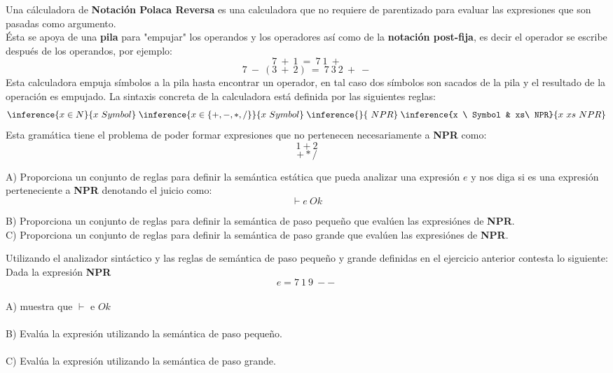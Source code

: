     \begin{exercise}
        Una cálculadora de \textbf{Notación Polaca Reversa} es una calculadora que no requiere de parentizado para evaluar las expresiones que son pasadas como argumento.\\
        Ésta se apoya de una \textbf{pila} para "empujar" los operandos y los operadores así como de la \textbf{notación post-fija}, es decir el operador se escribe después de los operandos, por ejemplo:
        $$7\ +\ 1\ =\ 7\ 1\ + $$ 
        $$7\ -\ (3\ +\ 2)\ =\ 7\ 3\ 2\ +\ -$$
        Esta calculadora empuja símbolos a la pila hasta encontrar un operador, en tal caso dos símbolos son sacados de la pila y el resultado de la operación es empujado.
        La sintaxis concreta de la calculadora está definida por las siguientes reglas: \\
        \[
            \inference{x \in N}{x \ Symbol} \; \inference{x \in \{+,-,*,/ \}}{x \ Symbol} \; \inference{}{\empty \ NPR} \; \inference{x \ Symbol & xs\ NPR}{x \ xs \ NPR}
        \]
        Esta gramática tiene el problema de poder formar expresiones que no pertenecen necesariamente a \textbf{NPR} como:
        $$ 1 + 2$$ 
        $$ + * /$$

        A) Proporciona un conjunto de reglas para definir la semántica estática que pueda analizar una expresión $e$ y nos diga si es una expresión perteneciente a \textbf{NPR} denotando el juicio como:
        $$ \vdash e \ Ok $$

        B) Proporciona un conjunto de reglas para definir la semántica de paso pequeño que evalúen las expresiónes de \textbf{NPR}.\\

        C) Proporciona un conjunto de reglas para definir la semántica de paso grande que evalúen las expresiónes de \textbf{NPR}.\\
    \end{exercise}

    \begin{exercise}
        Utilizando el analizador sintáctico y las reglas de semántica de paso pequeño y grande definidas en el ejercicio anterior contesta lo siguiente: \\

        Dada la expresión \textbf{NPR} $$e = 7\ 1\ 9 \ - -\ $$ \\
        A) muestra que $\vdash $ e $Ok$ \\\\
        B) Evalúa la expresión utilizando la semántica de paso pequeño.\\\\
        C) Evalúa la expresión utilizando la semántica de paso grande.
    \end{exercise}

